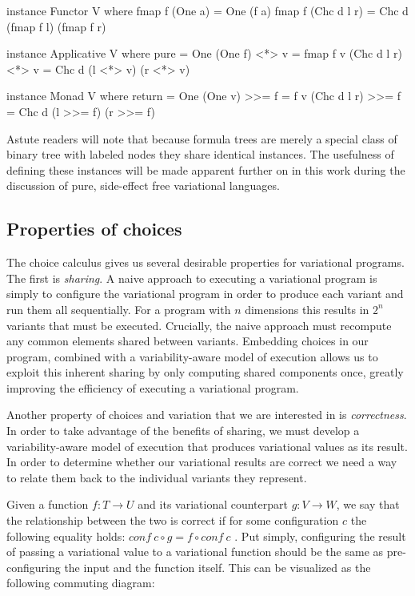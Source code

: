 \documentclass[letterpaper,10pt,onecolumn]{article}
\begin{document}
\begin{program}
instance Functor V where
  fmap f (One a) = One (f a)
  fmap f (Chc d l r) = Chc d (fmap f l) (fmap f r)
  
instance Applicative V where
  pure = One
  (One f) <*> v = fmap f v
  (Chc d l r) <*> v = Chc d (l <*> v) (r <*> v)
  
instance Monad V where
  return = One
  (One v) >>= f = f v
  (Chc d l r) >>= f = Chc d (l >>= f) (r >>= f)
\end{program}

Astute readers will note that because formula trees are merely a special class of binary tree with
labeled nodes they share identical instances. The usefulness of defining these instances will be made
apparent further on in this work during the discussion of pure, side-effect free variational languages.

\subsection{Properties of choices}

The choice calculus gives us several desirable properties for variational programs.
The first is \emph{sharing}. A naive approach to executing a variational program is simply to
configure the variational program in order to produce each variant and run them all sequentially.
For a program with $n$ dimensions this results in $2^n$ variants that must be executed. Crucially,
the naive approach must recompute any common elements shared between variants. Embedding
choices in our program, combined with a variability-aware model of execution allows us to exploit this
inherent sharing by only computing shared components once, greatly improving the efficiency of
executing a variational program.

Another property of choices and variation that we are interested in is \emph{correctness}. In order
to take advantage of the benefits of sharing, we must develop a variability-aware model of execution
that produces variational values as its result. In order to determine whether our variational results
are correct we need a way to relate them back to the individual variants they represent.

Given a function $f : T \rightarrow U$ and its variational counterpart $g : V \rightarrow W$, we say that
the relationship between the two is correct if for some configuration $c$ the following equality holds:
$\mathit{conf}\ c \circ g = f \circ \mathit{conf}\ c$ \cite{hubbard2016formula}. Put simply, configuring the result
of passing a variational value to a variational function should be the same as pre-configuring the input
and the function itself. This can be visualized as the following commuting diagram:
\end{document}
